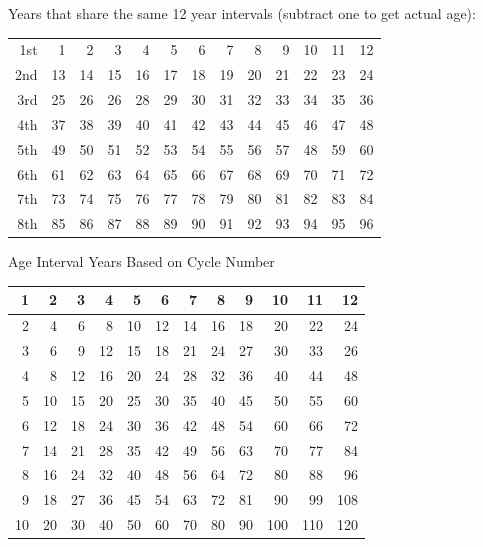 \begin{mdframed}[backgroundcolor=cyan!5]
\fontsize{7}{7}\selectfont
Years that share the same 12 year intervals (subtract one to get actual age):
\vspace{-1em}
\begin{longtable}[c]{r|rrrrrrrrrrrr}
\hline
1st 	& 1	& 2	& 3	& 4	& 5	& 6 
		& 7	& 8	& 9	& 10	& 11	& 12 \\
2nd	& 13 & 14 & 15 & 16 & 17 & 18 
		& 19 & 20 & 21 & 22 & 23 & 24 \\
\rowcolor{red!10}3rd	& 25 & 26 & 26 & 28 & 29 & 30 
		& 31 & 32 & 33 & 34 & 35 & 36 \\ 
4th	& 37 & 38 & 39 & 40 & 41 & 42
		& 43 & 44 & 45 & 46 & 47 & 48 \\
5th 	& 49 & 50 & 51 & 52 & 53 & 54
		& 55 & 56 & 57 & 48 & 59 & 60 \\ 
6th	& 61 & 62 & 63 & 64 & 65 & 66 
		& 67 & 68 & 69 & 70 & 71 & 72 \\ 
7th	& 73 & 74 & 75 & 76 & 77 & 78
		& 79 & 80 & 81 & 82 & 83 & 84 \\
8th  & 85 & 86 & 87 & 88 & 89 & 90
		& 91 & 92 & 93 & 94 & 95 & 96 \\ \hline
\end{longtable}

Age Interval Years Based on Cycle Number
\vspace{-1em}
\begin{longtable}[c]{r|rrrrrrrrrrr}
\hline
1	& 2	& 3	& 4	& 5	& 6 	& 7	& 8	& 9	& 10	
	& \cellcolor{red!10}11	& 12 \\ \hline
2  & 4   	& 6 	& 8 	& 10 	& 12 	& 14 	& 16 	& 18 	& 20 	& 22 	& 24 \\
\rowcolor{red!10}3	& 6	& 9	& 12	& 15	& 18	& 21	& 24	
	& 27	& \cellcolor{yellow!20} 30	& \cellcolor{yellow!20} 33	& 26 \\
4	& 8	& 12	& 16	& 20	& 24	& 28	& 32	& 36	& 40	& 44	& 48 \\
5	& 10	& 15	& 20	& 25	& 30	& 35	& 40	& 45	& 50	& 55	& 60 \\
6	& 12	& 18	& 24	& 30	& 36	& 42	& 48	& 54	& 60	& 66	& 72 \\
7	& 14	& 21	& 28	& 35	& 42	& 49	& 56	& 63	& 70	& 77	& 84 \\
8	& 16	& 24	& 32	& 40	& 48	& 56	& 64	& 72	& 80	& 88	& 96 \\
9	& 18	& 27	& 36	& 45	& 54	& 63	& 72	& 81	& 90	& 99	& 108 \\
10 & 20 & 30 & 40 & 50 & 60 & 70 & 80 & 90 & 100 & 110 & 120 \\

\end{longtable}
\end{mdframed}
